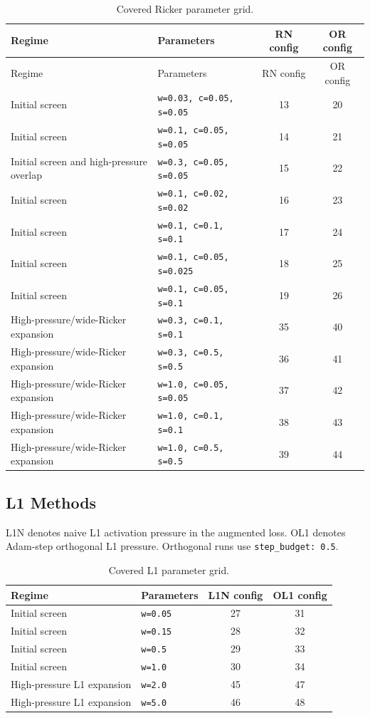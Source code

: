 \documentclass[10pt]{article}
\newcommand{\code}[1]{\texttt{#1}}
\begin{document}
\begin{longtable}{p{}p{}cc}
\caption{Covered Ricker parameter grid.}\\
\toprule
Regime & Parameters & RN config & OR config \\
\midrule
\endfirsthead
\toprule
Regime & Parameters & RN config & OR config \\
\midrule
\endhead
Initial screen & \code{w=0.03, c=0.05, s=0.05} & 13 & 20 \\
Initial screen & \code{w=0.1, c=0.05, s=0.05} & 14 & 21 \\
Initial screen and high-pressure overlap & \code{w=0.3, c=0.05, s=0.05} & 15 & 22 \\
Initial screen & \code{w=0.1, c=0.02, s=0.02} & 16 & 23 \\
Initial screen & \code{w=0.1, c=0.1, s=0.1} & 17 & 24 \\
Initial screen & \code{w=0.1, c=0.05, s=0.025} & 18 & 25 \\
Initial screen & \code{w=0.1, c=0.05, s=0.1} & 19 & 26 \\
High-pressure/wide-Ricker expansion & \code{w=0.3, c=0.1, s=0.1} & 35 & 40 \\
High-pressure/wide-Ricker expansion & \code{w=0.3, c=0.5, s=0.5} & 36 & 41 \\
High-pressure/wide-Ricker expansion & \code{w=1.0, c=0.05, s=0.05} & 37 & 42 \\
High-pressure/wide-Ricker expansion & \code{w=1.0, c=0.1, s=0.1} & 38 & 43 \\
High-pressure/wide-Ricker expansion & \code{w=1.0, c=0.5, s=0.5} & 39 & 44 \\
\bottomrule
\end{longtable}

\subsection*{L1 Methods}

L1N denotes naive L1 activation pressure in the augmented loss. OL1 denotes Adam-step orthogonal L1 pressure. Orthogonal runs use \code{step\_budget: 0.5}.

\begin{table}[H]
\centering
\caption{Covered L1 parameter grid.}
\begin{tabular}{llcc}
\toprule
Regime & Parameters & L1N config & OL1 config \\
\midrule
Initial screen & \code{w=0.05} & 27 & 31 \\
Initial screen & \code{w=0.15} & 28 & 32 \\
Initial screen & \code{w=0.5} & 29 & 33 \\
Initial screen & \code{w=1.0} & 30 & 34 \\
High-pressure L1 expansion & \code{w=2.0} & 45 & 47 \\
High-pressure L1 expansion & \code{w=5.0} & 46 & 48 \\
\bottomrule
\end{tabular}
\end{table}
\end{document}
